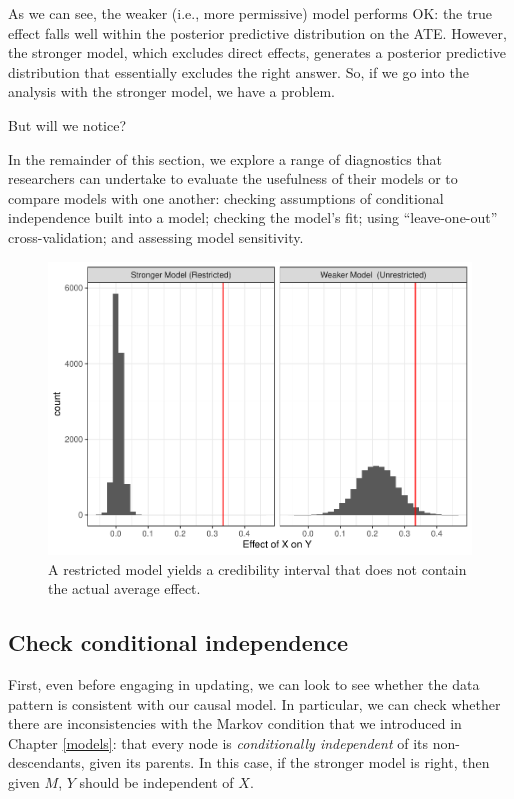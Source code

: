 \documentclass[
  12pt,
]{book}
\begin{document}
As we can see, the weaker (i.e., more permissive) model performs OK: the true effect falls well within the posterior predictive distribution on the ATE. However, the stronger model, which excludes direct effects, generates a posterior predictive distribution that essentially excludes the right answer. So, if we go into the analysis with the stronger model, we have a problem.

But will we notice?

In the remainder of this section, we explore a range of diagnostics that researchers can undertake to evaluate the usefulness of their models or to compare models with one another: checking assumptions of conditional independence built into a model; checking the model's fit; using ``leave-one-out'' cross-validation; and assessing model sensitivity.

\begin{figure}
\centering
\includegraphics{ii_files/figure-latex/badmodels15-1.pdf}
\caption{\label{fig:badmodels15}A restricted model yields a credibility interval that does not contain the actual average effect.}
\end{figure}

\hypertarget{check-conditional-independence}{%
\subsection{Check conditional independence}\label{check-conditional-independence}}

First, even before engaging in updating, we can look to see whether the data pattern is consistent with our causal model. In particular, we can check whether there are inconsistencies with the Markov condition that we introduced in Chapter \ref{models}: that every node is \emph{conditionally independent} of its non-descendants, given its parents. In this case, if the stronger model is right, then given \(M\), \(Y\) should be independent of \(X\).
\end{document}

